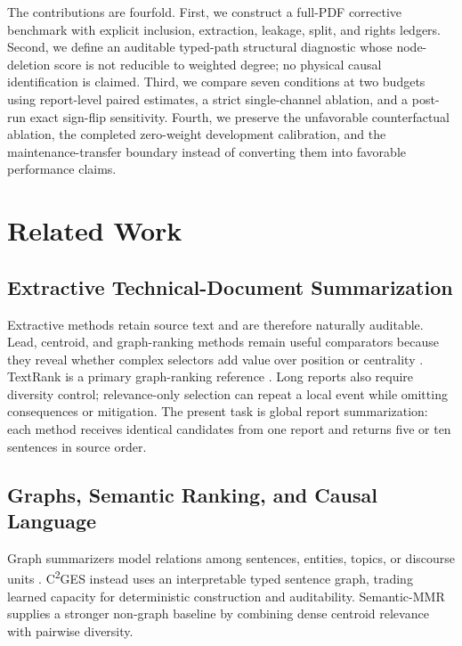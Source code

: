 \documentclass[applsci,article,submit,moreauthors]{Definitions/mdpi}
\newcommand{\cges}{C\textsuperscript{2}GES}
\begin{document}
The contributions are fourfold. First, we construct a full-PDF corrective benchmark with explicit inclusion, extraction, leakage, split, and rights ledgers. Second, we define an auditable typed-path structural diagnostic whose node-deletion score is not reducible to weighted degree; no physical causal identification is claimed. Third, we compare seven conditions at two budgets using report-level paired estimates, a strict single-channel ablation, and a post-run exact sign-flip sensitivity. Fourth, we preserve the unfavorable counterfactual ablation, the completed zero-weight development calibration, and the maintenance-transfer boundary instead of converting them into favorable performance claims.

\section{Related Work}

\subsection{Extractive Technical-Document Summarization}

Extractive methods retain source text and are therefore naturally auditable. Lead, centroid, and graph-ranking methods remain useful comparators because they reveal whether complex selectors add value over position or centrality \cite{zhong2020extractive,bi2021aredsum,liu2021unsupervised}. TextRank is a primary graph-ranking reference \cite{mihalcea2004textrank}. Long reports also require diversity control; relevance-only selection can repeat a local event while omitting consequences or mitigation. The present task is global report summarization: each method receives identical candidates from one report and returns five or ten sentences in source order.

\subsection{Graphs, Semantic Ranking, and Causal Language}

Graph summarizers model relations among sentences, entities, topics, or discourse units \cite{wang2020heterogeneous,cui2020enhancing,jing2021multiplex}. \cges{} instead uses an interpretable typed sentence graph, trading learned capacity for deterministic construction and auditability. Semantic-MMR supplies a stronger non-graph baseline by combining dense centroid relevance with pairwise diversity.
\end{document}
